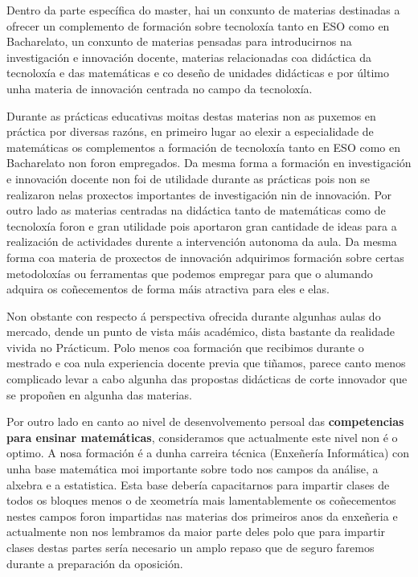 Dentro da parte específica do master, hai un conxunto de materias destinadas a ofrecer un complemento de formación sobre tecnoloxía tanto en ESO como en Bacharelato, un conxunto de materias pensadas para introducirnos na investigación e innovación docente, materias relacionadas coa didáctica da tecnoloxía e das matemáticas e co deseño de unidades didácticas e por último unha materia de innovación centrada no campo da tecnoloxía.

Durante as prácticas educativas moitas destas materias non as puxemos en práctica por diversas razóns, en primeiro lugar ao elexir a especialidade de matemáticas os complementos a formación de tecnoloxía tanto en ESO como en Bacharelato non foron empregados. Da mesma forma a formación en investigación e innovación docente non foi de utilidade durante as prácticas pois non se realizaron nelas proxectos importantes de investigación nin de innovación. Por outro lado as materias centradas na didáctica tanto de matemáticas como de tecnoloxía foron e gran utilidade pois aportaron gran cantidade de ideas para a realización de actividades durente a intervención autonoma da aula. Da mesma forma coa materia de proxectos de innovación adquirimos formación sobre certas metodoloxías ou ferramentas que podemos empregar para que o alumando adquira os coñecementos de forma máis atractiva para eles e elas.

Non obstante con respecto á perspectiva ofrecida durante algunhas aulas do mercado, dende un punto de vista máis académico, dista bastante da realidade vivida no Prácticum. Polo menos coa formación que recibimos durante o mestrado e coa nula experiencia docente previa que tiñamos, parece canto menos complicado levar a cabo algunha das propostas didácticas de corte innovador que se propoñen en algunha das materias. %

Por outro lado en canto ao nivel de desenvolvemento persoal das \textbf{competencias para ensinar matemáticas}, consideramos que actualmente este nivel non é o optimo. A nosa formación é a dunha carreira técnica (Enxeñería Informática) con unha base matemática moi importante sobre todo nos campos da análise, a alxebra e a estatistica. Esta base debería capacitarnos para impartir clases de todos os bloques menos o de xeometría mais lamentablemente os coñecementos nestes campos foron impartidas nas materias dos primeiros anos da enxeñeria e actualmente non nos lembramos da maior parte deles polo que para impartir clases destas partes sería necesario un amplo repaso que de seguro faremos durante a preparación da oposición.
